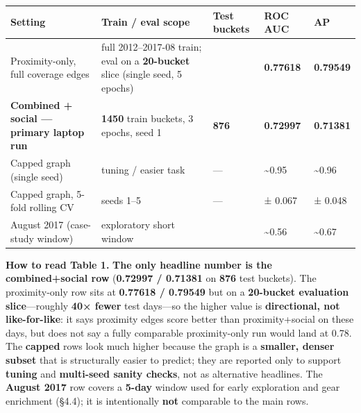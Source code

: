 \documentclass[
]{article}
\newcounter{none} %
\begin{document}
{\def\LTcaptype{none} %
\begin{longtable}[]{@{}
  >{\raggedright\arraybackslash}p{}
  >{\raggedright\arraybackslash}p{}
  >{\raggedright\arraybackslash}p{}
  >{\raggedright\arraybackslash}p{}
  >{\raggedright\arraybackslash}p{}@{}}
\toprule\noalign{}
\begin{minipage}[b]{\linewidth}\raggedright
Setting
\end{minipage} & \begin{minipage}[b]{\linewidth}\raggedright
Train / eval scope
\end{minipage} & \begin{minipage}[b]{\linewidth}\raggedright
Test buckets
\end{minipage} & \begin{minipage}[b]{\linewidth}\raggedright
ROC AUC
\end{minipage} & \begin{minipage}[b]{\linewidth}\raggedright
AP
\end{minipage} \\
\midrule\noalign{}
\endhead
\bottomrule\noalign{}
\endlastfoot
Proximity-only, full coverage edges & full 2012--2017-08 train; eval on
a \textbf{20-bucket} slice (single seed, 5 epochs) & 20 &
\textbf{0.77618} & \textbf{0.79549} \\
\textbf{Combined + social --- primary laptop run} & \textbf{1450} train
buckets, 3 epochs, seed 1 & \textbf{876} & \textbf{0.72997} &
\textbf{0.71381} \\
Capped graph (single seed) & tuning / easier task & --- &
\textasciitilde0.95 & \textasciitilde0.96 \\
Capped graph, 5-fold rolling CV & seeds 1--5 & --- & 0.927 ± 0.067 &
0.947 ± 0.048 \\
August 2017 (case-study window) & exploratory short window & 5 &
\textasciitilde0.56 & \textasciitilde0.67 \\
\end{longtable}
}

\textbf{How to read Table 1.} \textbf{The only headline number is the
combined+social row} (\textbf{0.72997 / 0.71381} on \textbf{876} test
buckets). The proximity-only row sits at \textbf{0.77618 / 0.79549} but
on a \textbf{20-bucket evaluation slice}---roughly \textbf{40× fewer}
test days---so the higher value is \textbf{directional, not
like-for-like}: it says proximity edges score better than
proximity+social on these days, but does not say a fully comparable
proximity-only run would land at 0.78. The \textbf{capped} rows look
much higher because the graph is a \textbf{smaller, denser subset} that
is structurally easier to predict; they are reported only to support
\textbf{tuning} and \textbf{multi-seed sanity checks}, not as
alternative headlines. The \textbf{August 2017} row covers a
\textbf{5-day} window used for early exploration and gear enrichment
(§4.4); it is intentionally \textbf{not} comparable to the main rows.
\end{document}
